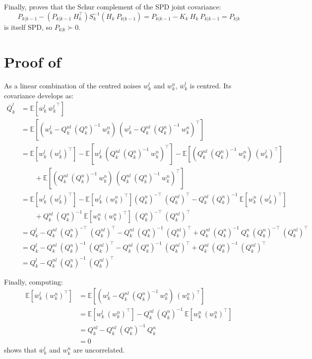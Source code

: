 Finally,  proves that the Schur complement of the SPD joint covariance:
\begin{equation}
	P_{k|k-1}-\left(P_{k|k-1}\:H_k^\top\right)S_k^{-1}\left(H_k\:P_{k|k-1}\right)=P_{k|k-1}-K_k\:H_k\:P_{k|k-1}=P_{k|k}
\end{equation}
is itself SPD, so $P_{k|k}\succ0$.

\section[Proof of Proposition 2.10]{Proof of }\label{sec:proof_RBPF}

As a linear combination of the centred noises $w_k^l$ and $w_k^n$, $\overline{w}_k^l$ is centred. Its covariance develops as:
\begin{equation}
	\begin{aligned}
	\overline{Q}_k^l&=\mathbb{E}\left[\overline{w}_k^l\:{\overline{w}_k^l}^\top\right]\\
	&=\mathbb{E}\left[(w_k^l-Q_k^{nl}\:(Q_k^n)^{-1}\:w_k^n)\:(w_k^l-Q_k^{nl}\:(Q_k^n)^{-1}\:w_k^n)^\top\right]\\
	&=\mathbb{E}\left[w_k^l\:(w_k^l)^\top\right]-\mathbb{E}\left[w_k^l\:(Q_k^{nl}\:(Q_k^n)^{-1}\:w_k^n)^\top\right]-\mathbb{E}\left[(Q_k^{nl}\:(Q_k^n)^{-1}\:w_k^n)\:(w_k^l)^\top\right]\\
	&\qquad+\mathbb{E}\left[(Q_k^{nl}\:(Q_k^n)^{-1}\:w_k^n)\:(Q_k^{nl}\:(Q_k^n)^{-1}\:w_k^n)^\top\right]\\
	&=\mathbb{E}\left[w_k^l\:(w_k^l)^\top\right]-\mathbb{E}\left[w_k^l\:(w_k^n)^\top\right](Q_k^n)^{-\top}\:(Q_k^{nl})^\top-Q_k^{nl}\:(Q_k^n)^{-1}\:\mathbb{E}\left[w_k^n\:(w_k^l)^\top\right]\\
	&\qquad+Q_k^{nl}\:(Q_k^n)^{-1}\:\mathbb{E}\left[w_k^n\:(w_k^n)^\top\right]\:(Q_k^n)^{-\top}\:(Q_k^{nl})^\top\\
	&=Q_k^l-Q_k^{nl}\:(Q_k^n)^{-\top}\:(Q_k^{nl})^\top-Q_k^{nl}\:(Q_k^n)^{-1}\:(Q_k^{nl})^\top+Q_k^{nl}\:(Q_k^n)^{-1}\:Q_k^n\:(Q_k^n)^{-\top}\:(Q_k^{nl})^\top\\
	&=Q_k^l-Q_k^{nl}\:(Q_k^n)^{-1}\:(Q_k^{nl})^\top-Q_k^{nl}\:(Q_k^n)^{-1}\:(Q_k^{nl})^\top+Q_k^{nl}\:(Q_k^n)^{-1}\:(Q_k^{nl})^\top\\
	&=Q_k^l-Q_k^{nl}\:(Q_k^n)^{-1}\:(Q_k^{nl})^\top
	\end{aligned}
\end{equation}

Finally, computing:
\begin{equation}
	\begin{aligned}
	\mathbb{E}\left[\overline{w}_k^l\:(w_k^n)^\top\right]&=\mathbb{E}\left[(w_k^l-Q_k^{nl}\:(Q_k^n)^{-1}\:w_k^n)\:(w_k^n)^\top\right]\\
	&=\mathbb{E}\left[w_k^l\:(w_k^n)^\top\right]-Q_k^{nl}\:(Q_k^n)^{-1}\:\mathbb{E}\left[w_k^n\:(w_k^n)^\top\right]\\
	&=Q_k^{nl}-Q_k^{nl}\:(Q_k^n)^{-1}\:Q_k^n\\
	&=0
	\end{aligned}
\end{equation}
shows that $\overline{w}_k^l$ and $w_k^n$ are uncorrelated.

